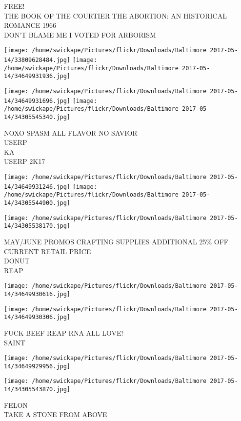 \documentclass[10pt,letterpaper]{article}
\begin{document}
FREE!\\
THE BOOK OF THE COURTIER THE ABORTION: AN HISTORICAL ROMANCE 1966\\
DON'T BLAME ME I VOTED FOR ARBORISM
\pagebreak

\texttt{[image: /home/swickape/Pictures/flickr/Downloads/Baltimore 2017-05-14/33809628484.jpg]}
\texttt{[image: /home/swickape/Pictures/flickr/Downloads/Baltimore 2017-05-14/34649931936.jpg]}

\texttt{[image: /home/swickape/Pictures/flickr/Downloads/Baltimore 2017-05-14/34649931696.jpg]}
\texttt{[image: /home/swickape/Pictures/flickr/Downloads/Baltimore 2017-05-14/34305545340.jpg]}

NOXO SPASM ALL FLAVOR NO SAVIOR\\
USERP\\
KA\\
USERP 2K17
\pagebreak

\texttt{[image: /home/swickape/Pictures/flickr/Downloads/Baltimore 2017-05-14/34649931246.jpg]}
\texttt{[image: /home/swickape/Pictures/flickr/Downloads/Baltimore 2017-05-14/34305544900.jpg]}

\vspace{0.25in}
\texttt{[image: /home/swickape/Pictures/flickr/Downloads/Baltimore 2017-05-14/34305538170.jpg]}

MAY/JUNE PROMOS CRAFTING SUPPLIES ADDITIONAL 25\% OFF CURRENT RETAIL PRICE\\
DONUT\\
REAP
\pagebreak

\texttt{[image: /home/swickape/Pictures/flickr/Downloads/Baltimore 2017-05-14/34649930616.jpg]}

\vspace{0.25in}
\texttt{[image: /home/swickape/Pictures/flickr/Downloads/Baltimore 2017-05-14/34649930306.jpg]}

FUCK BEEF REAP RNA ALL LOVE!\\
SAINT
\pagebreak

\texttt{[image: /home/swickape/Pictures/flickr/Downloads/Baltimore 2017-05-14/34649929956.jpg]}

\vspace{0.25in}
\texttt{[image: /home/swickape/Pictures/flickr/Downloads/Baltimore 2017-05-14/34305543870.jpg]}

FELON\\
TAKE A STONE FROM ABOVE
\pagebreak
\end{document}
